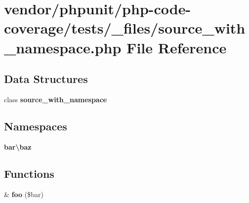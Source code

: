 \section{vendor/phpunit/php-\/code-\/coverage/tests/\+\_\+files/source\+\_\+with\+\_\+namespace.php File Reference}
\label{source__with__namespace_8php}
\subsection*{Data Structures}
\begin{DoxyCompactItemize}
\item 
class {\bf source\+\_\+with\+\_\+namespace}
\end{DoxyCompactItemize}
\subsection*{Namespaces}
\begin{DoxyCompactItemize}
\item 
 {\bf bar\textbackslash{}baz}
\end{DoxyCompactItemize}
\subsection*{Functions}
\begin{DoxyCompactItemize}
\item 
\& {\bf foo} (\$bar)
\end{DoxyCompactItemize}
